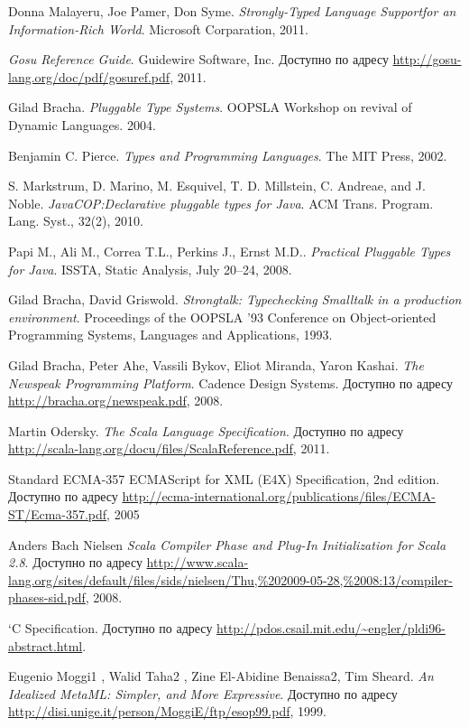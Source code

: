 \begin{thebibliography}{9}

    Donna Malayeru, Joe Pamer, Don Syme.
    \emph{Strongly-Typed Language Supportfor an Information-Rich World}.
    Microsoft Corparation,
    2011.

    \emph{Gosu Reference Guide}.
    Guidewire Software, Inc.
    Доступно по адресу \url{http://gosu-lang.org/doc/pdf/gosuref.pdf},
    2011.

    Gilad Bracha.
    \emph{Pluggable Type Systems}.
    OOPSLA Workshop on revival of Dynamic Languages.
    2004.

    Benjamin C. Pierce.
    \emph{Types and Programming Languages}.
    The MIT Press, 2002.

    S. Markstrum, D. Marino, M. Esquivel, T. D. Millstein, C. Andreae, and J. Noble.
    \emph{JavaCOP:\@ Declarative pluggable types for Java}.
    ACM Trans. Program. Lang. Syst., 32(2), 2010.

    Papi M., Ali M., Correa T.L., Perkins J., Ernst M.D..
    \emph{Practical Pluggable Types for Java}.
    ISSTA, Static Analysis, July 20–24, 2008.

    Gilad Bracha, David Griswold.
    \emph{Strongtalk: Typechecking Smalltalk in a production environment}.
    Proceedings of the OOPSLA '93 Conference on Object-oriented Programming Systems, Languages and Applications, 1993.

    Gilad Bracha, Peter Ahe, Vassili Bykov, Eliot Miranda, Yaron Kashai.
    \emph{The Newspeak Programming Platform}.
    Cadence Design Systems.
    Доступно по адресу \url{http://bracha.org/newspeak.pdf},
    2008.

    Martin Odersky.
    \emph{The Scala Language Specification}.
    Доступно по адресу \url{http://scala-lang.org/docu/files/ScalaReference.pdf},
    2011.

    Standard ECMA-357
    ECMAScript for XML (E4X) Specification,
    2nd edition.
    Доступно по адресу \url{http://ecma-international.org/publications/files/ECMA-ST/Ecma-357.pdf},
    2005

    Anders Bach Nielsen
    \emph{Scala Compiler Phase and Plug-In Initialization for Scala 2.8}.
    Доступно по адресу \url{http://www.scala-lang.org/sites/default/files/sids/nielsen/Thu,%202009-05-28,%2008:13/compiler-phases-sid.pdf},
    2008.

    `C Specification.
    Доступно по адресу \url{http://pdos.csail.mit.edu/~engler/pldi96-abstract.html}.

    Eugenio Moggi1 , Walid Taha2 , Zine El-Abidine Benaissa2, Tim Sheard.
    \emph{An Idealized MetaML: Simpler, and More Expressive}.
    Доступно по адресу \url{http://disi.unige.it/person/MoggiE/ftp/esop99.pdf},
    1999.

\end{thebibliography}